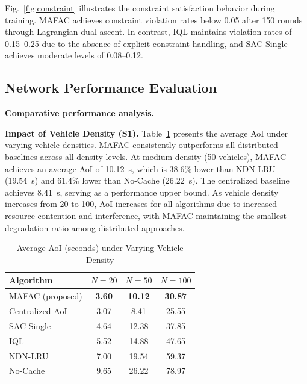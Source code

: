\documentclass[journal]{IEEEtran}
\begin{document}

Fig.~\ref{fig:constraint} illustrates the constraint satisfaction behavior during training. MAFAC achieves constraint violation rates below 0.05 after 150 rounds through Lagrangian dual ascent. In contrast, IQL maintains violation rates of 0.15--0.25 due to the absence of explicit constraint handling, and SAC-Single achieves moderate levels of 0.08--0.12.


\subsection{Network Performance Evaluation} \label{sec.s2}

\textbf{Comparative performance analysis.}

\textbf{Impact of Vehicle Density (S1).} Table~\ref{tab:s1_results} presents the average AoI under varying vehicle densities. MAFAC consistently outperforms all distributed baselines across all density levels. At medium density (50 vehicles), MAFAC achieves an average AoI of 10.12~s, which is 38.6\% lower than NDN-LRU (19.54~s) and 61.4\% lower than No-Cache (26.22~s). The centralized baseline achieves 8.41~s, serving as a performance upper bound. As vehicle density increases from 20 to 100, AoI increases for all algorithms due to increased resource contention and interference, with MAFAC maintaining the smallest degradation ratio among distributed approaches.

\begin{table}[!t]
\centering
\caption{Average AoI (seconds) under Varying Vehicle Density}
\label{tab:s1_results}
\begin{tabular}{l c c c}
\toprule
\textbf{Algorithm} & $N = 20$ & $N = 50$ & $N = 100$ \\
\midrule
MAFAC (proposed)  & \textbf{3.60}  & \textbf{10.12} & \textbf{30.87} \\
Centralized-AoI   & 3.07           & 8.41           & 25.55 \\
SAC-Single         & 4.64           & 12.38          & 37.85 \\
IQL                & 5.52           & 14.88          & 47.65 \\
NDN-LRU            & 7.00           & 19.54          & 59.37 \\
No-Cache           & 9.65           & 26.22          & 78.97 \\
\bottomrule
\end{tabular}
\end{table}
\end{document}
